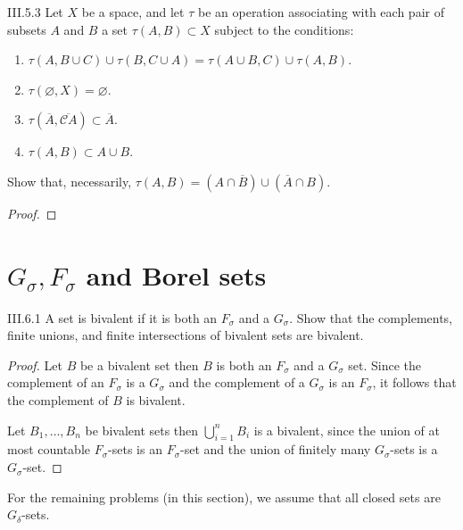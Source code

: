 \begin{problem}{III.5.3}
Let \(X\) be a space, and let \( \tau \) be an operation associating with each pair of subsets \(A\) and \(B\) a set \(\tau(A, B) \subset X\) subject to the conditions:
\begin{enumerate}[label={\alph*.}]
	\item \( \tau(A, B \cup C) \cup \tau(B, C\cup A) = \tau(A\cup B, C) \cup \tau(A, B) \).
	\item \( \tau(\varnothing, X) = \varnothing \).
	\item \( \tau(\overline{A}, \overline{\mathscr{C}A}) \subset \overline{A} \).
	\item \( \tau(A, B) \subset A \cup B \).
\end{enumerate}

Show that, necessarily, \( \tau(A, B) = (A \cap \overline{B}) \cup (\overline{A} \cap B) \).
\end{problem}

\begin{proof}
\end{proof}

\section{\( G_{\sigma}, F_{\sigma} \) and Borel sets}

\begin{problem}{III.6.1}\label{problem:III.6.1}
A set is bivalent if it is both an \(F_{\sigma}\) and a \(G_{\sigma}\). Show that the complements, finite unions, and finite intersections of bivalent sets are bivalent.
\end{problem}

\begin{proof}
	Let \(B\) be a bivalent set then \(B\) is both an \(F_{\sigma}\) and a \(G_{\sigma}\) set. Since the complement of an \(F_{\sigma}\) is a \(G_{\sigma}\) and the complement of a \(G_{\sigma}\) is an \(F_{\sigma}\), it follows that the complement of \(B\) is bivalent.

	Let \( B_{1}, \ldots, B_{n} \) be bivalent sets then \( \bigcup^{n}_{i=1}B_{i} \) is a bivalent, since the union of at most countable \(F_{\sigma}\)-sets is an \(F_{\sigma}\)-set and the union of finitely many \(G_{\sigma}\)-sets is a \(G_{\sigma}\)-set.
\end{proof}

For the remaining problems (in this section), we assume that all closed sets are \(G_{\delta}\)-sets.

